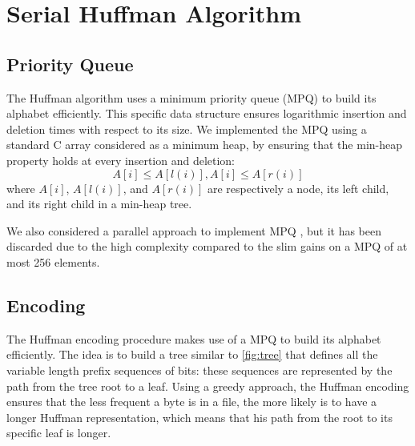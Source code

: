 \section{Serial Huffman Algorithm}
\subsection{Priority Queue}
The Huffman algorithm uses a minimum priority queue (MPQ) to build its alphabet efficiently. This specific data structure ensures logarithmic insertion and deletion times with respect to its size.
We implemented the MPQ using a standard C array considered as a minimum heap, by ensuring that the min-heap property holds at every insertion and deletion:
\begin{equation}
    A[i] \le A[l(i)], A[i] \le A[r(i)]
\end{equation}
where \(A[i]\), \(A[l(i)]\), and \(A[r(i)]\) are respectively a node, its left child, and its right child in a min-heap tree.

We also considered a parallel approach to implement MPQ \cite{BRODAL19984}, but it has been discarded due to the high complexity compared to the slim gains on a MPQ of at most 256 elements.

\subsection{Encoding}
The Huffman encoding procedure makes use of a MPQ to build its alphabet efficiently. The idea is to build a tree similar to \cref{fig:tree} that defines all the variable length prefix sequences of bits: these sequences are represented by the path from the tree root to a leaf. Using a greedy approach, the Huffman encoding ensures that the less frequent a byte is in a file, the more likely is to have a longer Huffman representation, which means that his path from the root to its specific leaf is longer.

